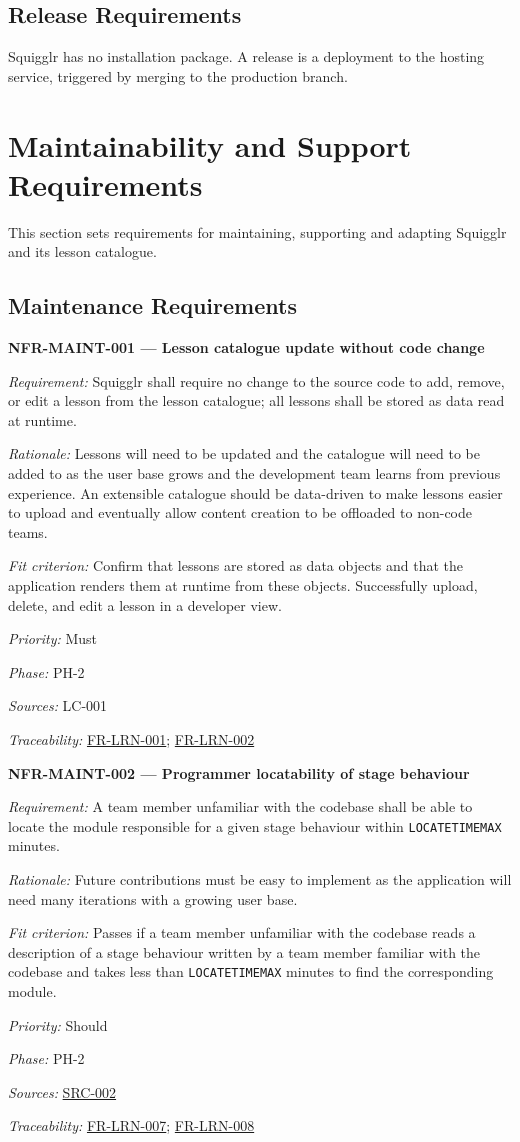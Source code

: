 \documentclass[12pt]{article}
\renewcommand{\_}{\textunderscore\allowbreak}%
\newenvironment{srsrequirement}[2]{%
  \par\medskip\noindent\phantomsection\label{req:#1}%
  \textbf{#1 --- #2}\par\nobreak\smallskip }{\par\medskip}
\newcommand{\reqfield}[2]{\noindent\textit{#1:} #2\par}
\newcommand{\reqshall}[1]{\reqfield{Requirement}{#1}}
\newcommand{\reqrationale}[1]{\reqfield{Rationale}{#1}}
\newcommand{\reqfit}[1]{\reqfield{Fit criterion}{#1}}
\newcommand{\reqpriority}[1]{\reqfield{Priority}{#1}}
\newcommand{\reqphase}[1]{\reqfield{Phase}{#1}}
\newcommand{\reqsources}[1]{\reqfield{Sources}{#1}}
\newcommand{\reqtraces}[1]{\reqfield{Traceability}{#1}}
\newcommand{\reqref}[1]{\hyperref[req:#1]{#1}}
\newcommand{\srcref}[1]{\hyperref[src:#1]{SRC-#1}}
\begin{document}
\subsection{Release Requirements}

Squigglr has no installation package. A release is a deployment to the hosting
service, triggered by merging to the production branch.

\section{Maintainability and Support Requirements}
This section sets requirements for maintaining, supporting and adapting Squigglr
and its lesson catalogue.

\subsection{Maintenance Requirements}

\begin{srsrequirement}{NFR-MAINT-001}{Lesson catalogue update without code change}
  \reqshall{Squigglr shall require no change to the source code to add, remove,
or edit a lesson from the lesson catalogue; all lessons shall be stored as data
read at runtime.} \reqrationale{Lessons will need to be updated and the
catalogue will need to be added to as the user base grows and the development
team learns from previous experience. An extensible catalogue should be
data-driven to make lessons easier to upload and eventually allow content
creation to be offloaded to non-code teams.} \reqfit{Confirm that lessons are
stored as data objects and that the application renders them at runtime from
these objects. Successfully upload, delete, and edit a lesson in a developer
view.}
  \reqpriority{Must}
  \reqphase{PH-2}
  \reqsources{LC-001}
  \reqtraces{\reqref{FR-LRN-001}; \reqref{FR-LRN-002}}
\end{srsrequirement}

\begin{srsrequirement}{NFR-MAINT-002}{Programmer locatability of stage behaviour}
  \reqshall{A team member unfamiliar with the codebase shall be able to locate
the module responsible for a given stage behaviour within
\texttt{LOCATE\_TIME\_MAX} minutes.} \reqrationale{Future contributions must be
easy to implement as the application will need many iterations with a growing
user base.} \reqfit{Passes if a team member unfamiliar with the codebase reads a
description of a stage behaviour written by a team member familiar with the
codebase and takes less than \texttt{LOCATE\_TIME\_MAX} minutes to find the
corresponding module.}
  \reqpriority{Should}
  \reqphase{PH-2}
  \reqsources{\srcref{002}} \reqtraces{\reqref{FR-LRN-007}; \reqref{FR-LRN-008}}
\end{srsrequirement}
\end{document}
